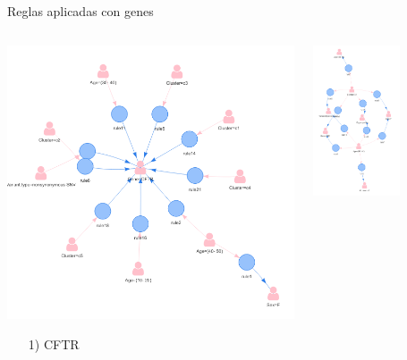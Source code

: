 \documentclass[xcolor=dvipsnames]{beamer}
\begin{document}
\begin{frame}{Reglas aplicadas con genes}
\begin{columns}
\begin{column}{0.5\textwidth}
\begin{center}
\includegraphics[width=1\textwidth]{CFTR2.png} \\
\begin{itemize}
   \centering
    \item[1)] CFTR
\end{itemize}
\end{center}
\end{column}
\begin{column}{0.5\textwidth}  %
    \begin{center}
     \includegraphics[width=0.6\textwidth]{RB1.png}

\end{center}
\end{column}
\end{columns}
\end{frame}
\end{document}
